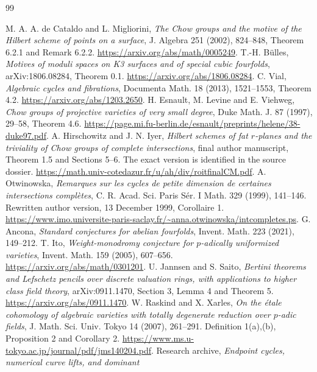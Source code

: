 \documentclass[11pt,a4paper]{article}
\theoremstyle{definition}
\theoremstyle{remark}\newtheorem{remark}[theorem]{Remark}
\numberwithin{equation}{section}
\begin{document}
\begin{thebibliography}{99}

 M. A. A. de Cataldo and L. Migliorini,
\emph{The Chow groups and the motive of the Hilbert scheme of points
on a surface}, J. Algebra 251 (2002), 824--848, Theorem 6.2.1 and
Remark 6.2.2. \url{https://arxiv.org/abs/math/0005249}.
 T.-H. B\"ulles, \emph{Motives of moduli spaces on K3
surfaces and of special cubic fourfolds}, arXiv:1806.08284, Theorem 0.1.
\url{https://arxiv.org/abs/1806.08284}.
 C. Vial, \emph{Algebraic cycles and fibrations},
Documenta Math. 18 (2013), 1521--1553, Theorem 4.2.
\url{https://arxiv.org/abs/1203.2650}.
 H. Esnault, M. Levine and E. Viehweg,
\emph{Chow groups of projective varieties of very small degree},
Duke Math. J. 87 (1997), 29--58, Theorem 4.6.
\url{https://page.mi.fu-berlin.de/esnault/preprints/helene/38-duke97.pdf}.
 A. Hirschowitz and J. N. Iyer,
\emph{Hilbert schemes of fat $r$-planes and the triviality of Chow
groups of complete intersections}, final author manuscript,
Theorem 1.5 and Sections 5--6. The exact version is identified in
the source dossier.
\url{https://math.univ-cotedazur.fr/u/ah/div/roitfinalCM.pdf}.
 A. Otwinowska,
\emph{Remarques sur les cycles de petite dimension de certaines
intersections compl\`etes}, C. R. Acad. Sci. Paris S\'er. I Math.
329 (1999), 141--146. Rewritten author version, 13 December 1999,
Corollaire 1.
\url{https://www.imo.universite-paris-saclay.fr/~anna.otwinowska/intcompletes.ps}.
 G. Ancona, \emph{Standard conjectures for abelian
fourfolds}, Invent. Math. 223 (2021), 149--212.
 T. Ito, \emph{Weight-monodromy conjecture for
$p$-adically uniformized varieties}, Invent. Math. 159 (2005),
607--656. \url{https://arxiv.org/abs/math/0301201}.
 U. Jannsen and S. Saito,
\emph{Bertini theorems and Lefschetz pencils over discrete valuation
rings, with applications to higher class field theory},
arXiv:0911.1470, Section 3, Lemma 4 and Theorem 5.
\url{https://arxiv.org/abs/0911.1470}.
 W. Raskind and X. Xarles,
\emph{On the \'etale cohomology of algebraic varieties with totally degenerate
reduction over $p$-adic fields}, J. Math. Sci. Univ. Tokyo 14
(2007), 261--291. Definition 1(a),(b), Proposition 2 and Corollary 2.
\url{https://www.ms.u-tokyo.ac.jp/journal/pdf/jms140204.pdf}.
 Research archive,
\emph{Endpoint cycles, numerical curve lifts, and dominant
}
\end{thebibliography}
\end{document}

